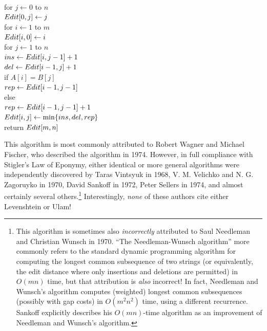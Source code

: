 \begin{pseudocode}
\\
for $j \gets 0$ to $n$\\
\Indent $Edit[0, j] \gets j$\\
for $i \gets 1$ to $m$\\
\Indent $Edit[i, 0] \gets i$\\
\Indent for $j \gets 1$ to $n$\\
\Indent\Indent $ins \gets Edit[i, j-1] + 1$\\
\Indent\Indent $del \gets Edit[i-1, j] + 1$\\
\Indent\Indent if $A[i] = B[j]$\\
\Indent\Indent\Indent $rep \gets Edit[i-1, j-1]$\\
\Indent\Indent else\\
\Indent\Indent\Indent $rep \gets Edit[i-1, j-1] + 1$\\
\Indent\Indent $Edit[i, j] \gets \min\{ins, del, rep\}$\\
return $Edit[m, n]$
\end{pseudocode}

This algorithm is most commonly attributed to Robert Wagner and Michael Fischer, who described the algorithm in 1974.
However, in full compliance with Stigler’s Law of Eponymy, either identical or more general algorithms were independently discovered by Taras Vintsyuk in 1968, V. M. Velichko and N. G. Zagoruyko in 1970, David Sankoff in 1972, Peter Sellers in 1974, and almost certainly several others.\footnote{This algorithm is sometimes also \textit{incorrectly} attributed to Saul Needleman and Christian Wunsch in 1970. “The Needleman-Wunsch algorithm” more commonly refers to the standard dynamic programming algorithm for computing the longest common subsequence of two strings (or equivalently, the edit distance where only insertions and deletions are permitted) in $O(mn)$ time, but that attribution is \textit{also} incorrect! In fact, Needleman and Wunsch’s algorithm computes (weighted) longest common subsequences (possibly with gap costs) in $O(m^2 n^2)$ time, using a different recurrence. Sankoff explicitly describes his $O(mn)$-time algorithm as an improvement of Needleman and Wunsch’s algorithm.}
Interestingly, \textit{none} of these authors cite either Levenshtein or Ulam!

